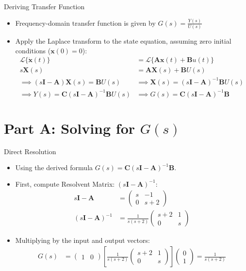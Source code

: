 \documentclass{beamer}
\theoremstyle{remark}
\newcommand{\myvec}[1]{\ensuremath{\begin{pmatrix}#1\end{pmatrix}}}
\let\vec\mathbf
\numberwithin{equation}{section}
\begin{document}
\begin{frame}{Deriving Transfer Function}
    \begin{itemize}
        \item Frequency-domain transfer function is given by $G(s) = \frac{Y(s)}{U(s)}$
        \item Apply the Laplace transform to the state equation, assuming zero initial conditions ($\vec{x}(0) = 0$):
        \begin{align}
            \mathcal{L}\{\dot{\vec{x}}(t)\} &= \mathcal{L}\{\vec{A}\vec{x}(t) + \vec{B}u(t)\} \\
            s\vec{X}(s) &= \vec{A}\vec{X}(s) + \vec{B}U(s) \\
            \implies (s\vec{I} - \vec{A})\vec{X}(s) = \vec{B}U(s) &\implies \vec{X}(s) = (s\vec{I} - \vec{A})^{-1}\vec{B}U(s) \\
            \implies Y(s) = \vec{C}(s\vec{I} - \vec{A})^{-1}\vec{B}U(s) &\implies G(s) = \vec{C}(s\vec{I} - \vec{A})^{-1}\vec{B}
        \end{align}
    \end{itemize}
\end{frame}

\section{Part A: Solving for $G(s)$}

\begin{frame}{Direct Resolution}
    \begin{itemize}
        \item Using the derived formula $G(s) = \vec{C}(s\vec{I} - \vec{A})^{-1}\vec{B}$.
        \item First, compute Resolvent Matrix: $(s\vec{I} - \vec{A})^{-1}$:
        \begin{align}
            s\vec{I} - \vec{A} &= \myvec{ s & -1 \\ 0 & s+2 } \\
            (s\vec{I} - \vec{A})^{-1} &= \frac{1}{s(s+2)} \myvec{ s+2 & 1 \\ 0 & s }
        \end{align}
        \item Multiplying by the input and output vectors:
        \begin{align}
            G(s) &= \myvec{ 1 & 0 } \left[ \frac{1}{s(s+2)} \myvec{ s+2 & 1 \\ 0 & s } \right] \myvec{ 0 \\ 1 } = \frac{1}{s(s+2)}
        \end{align}
    \end{itemize}
\end{frame}
\end{document}
